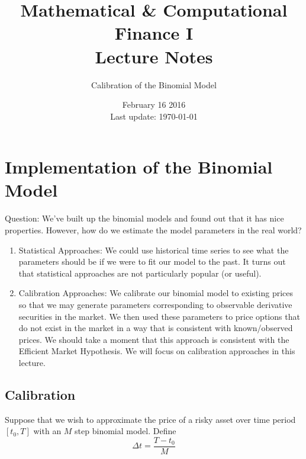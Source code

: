 \documentclass[12pt]{article}
\newlength\tindent
\renewcommand{\indent}{\hspace*{\tindent}}
\begin{document}
 
 
\title{Mathematical \& Computational Finance I\\Lecture Notes}
\author{Calibration of the Binomial Model}
\date{February 16 2016 \\ Last update: \today{}}
\maketitle

\section{Implementation of the Binomial Model}

\indent Question: We've built up the binomial models and found out that it has nice properties. However, how do we estimate the model parameters in the real world?
\begin{enumerate}[(1)]
	\item Statistical Approaches: We could use historical time series to see what the parameters should be if we were to fit our model to the past. It turns out that statistical approaches are not particularly popular (or useful).
	
	\item Calibration Approaches: We calibrate our binomial model to existing prices so that we may generate parameters corresponding to observable derivative securities in the market. We then used these parameters to price options that do not exist in the market in a way that is consistent with known/observed prices. We should take a moment that this approach is consistent with the Efficient Market Hypothesis. We will focus on calibration approaches in this lecture.
\end{enumerate}

\subsection{Calibration}

\indent Suppose that we wish to approximate the price of a risky asset over time period $[t_0,T]$ with an $M$ step binomial model. Define
\begin{equation*}
	\Delta t = \frac{ T - t_0 }{M}
\end{equation*}
\end{document}
